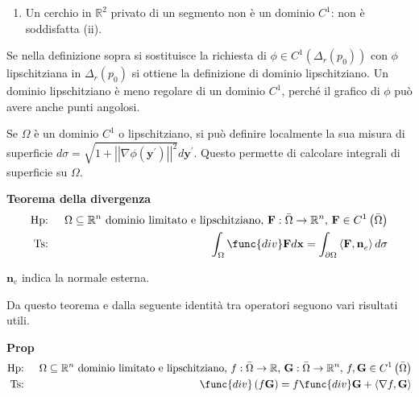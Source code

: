 \documentclass{article}
\begin{document}
\begin{enumerate}
\item Un cerchio in $%
\mathbb{R}
^{2}$ privato di un segmento non \`{e} un dominio $C^{1}$: non \`{e}
soddisfatta (ii).
\end{enumerate}

Se nella definizione sopra si sostituisce la richiesta di $\phi \in
C^{1}\left( \Delta _{r}\left( p_{0}\right) \right) $ con $\phi $
lipschitziana in $\Delta _{r}\left( p_{0}\right) $ si ottiene la definizione
di dominio lipschitziano. Un dominio lipschitziano \`{e} meno regolare di un
dominio $C^{1}$, perch\'{e} il grafico di $\phi $ pu\`{o} avere anche punti
angolosi.

Se $\Omega $ \`{e} un dominio $C^{1}$ o lipschitziano, si pu\`{o} definire
localmente la sua misura di superficie $d\sigma =\sqrt{1+\left\vert
\left\vert \nabla \phi \left( \mathbf{y}^{\prime }\right) \right\vert
\right\vert ^{2}}d\mathbf{y}^{\prime }$. Questo permette di calcolare
integrali di superficie su $\Omega $.

\textbf{Teorema della divergenza}%
\begin{eqnarray*}
\text{Hp} &\text{: }&\Omega \subseteq 
\mathbb{R}
^{n}\text{ dominio limitato e lipschitziano, }\mathbf{F}:\bar{\Omega}%
\rightarrow 
\mathbb{R}
^{n}\text{, }\mathbf{F}\in C^{1}\left( \bar{\Omega}\right) \\
\text{Ts} &\text{: }&\int_{\Omega }\func{div}\mathbf{F}d\mathbf{x}%
=\int_{\partial \Omega }\left\langle \mathbf{F,n}_{e}\right\rangle d\sigma
\end{eqnarray*}

$\mathbf{n}_{e}$ indica la normale esterna.

Da questo teorema e dalla seguente identit\`{a} tra operatori seguono vari
risultati utili.

\textbf{Prop}%
\begin{eqnarray*}
\text{Hp} &\text{: }&\Omega \subseteq 
\mathbb{R}
^{n}\text{ dominio limitato e lipschitziano, }f:\bar{\Omega}\rightarrow 
\mathbb{R}
\text{, }\mathbf{G}:\bar{\Omega}\rightarrow 
\mathbb{R}
^{n}\text{, }f,\mathbf{G}\in C^{1}\left( \bar{\Omega}\right) \\
\text{Ts} &\text{: }&\func{div}\left( f\mathbf{G}\right) =f\func{div}\mathbf{%
G}+\left\langle \nabla f,\mathbf{G}\right\rangle
\end{eqnarray*}
\end{document}
